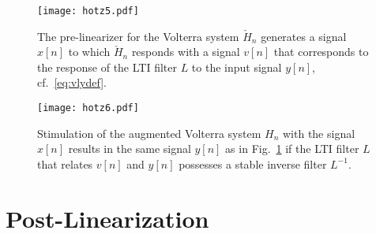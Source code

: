 \documentclass[10pt,twocolumn,twoside]{IEEEtran}
\begin{document}
\begin{figure}[!t]
	\centering
	\texttt{[image: hotz5.pdf]}
	\caption{The pre-linearizer for the Volterra system $\check{H}_n$
		generates a signal $x[n]$ to which $\check{H}_n$ responds with a signal $v[n]$
		that corresponds to the response of the
		LTI filter $L$ to the input signal $y[n]$, cf.~\eqref{eq:vlydef}.}
	\label{fig:hnprelin:a}
\end{figure}
\begin{figure}[!t]
	\centering
	\texttt{[image: hotz6.pdf]}
	\caption{Stimulation of the augmented Volterra system $H_n$ with the signal $x[n]$
		results in the same signal $y[n]$ as in Fig.~\ref{fig:hnprelin:a} if the LTI
		filter $L$ that relates $v[n]$ and $y[n]$ possesses a stable inverse filter $L^{-1}$.}
	\label{fig:prelinaltsys}
\end{figure}



\section{Post-Linearization}
	\label{postlin}
\end{document}
